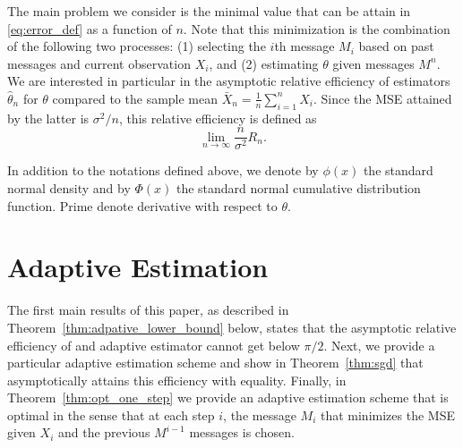 \documentclass[letterpaper, conference]{IEEEtran}      %
\begin{document}
The main problem we consider is the minimal value that can be attain in \eqref{eq:error_def} as a function of $n$. Note that this minimization is the combination of the following two processes: (1) selecting the $i$th message $M_i$ based on past messages and current observation $X_i$, and (2) estimating $\theta$ given messages $M^n$. We are interested in particular in the asymptotic relative efficiency of estimators $\widehat{\theta}_n$ for $\theta$ compared to the sample mean $\bar{X}_n = \frac{1}{n} \sum_{i=1}^n X_i$. Since the MSE attained by the latter is $\sigma^2/n$, this relative efficiency is defined as
\begin{equation}
 \lim_{n \rightarrow \infty} \frac{n}{\sigma^2}  R_n. 
\label{eq:relative_efficiency}
\end{equation}

In addition to the notations defined above, we denote by $\phi(x)$ the standard normal density and by $\Phi(x)$ the standard normal cumulative distribution function. Prime denote derivative with respect to $\theta$.


\section{Adaptive Estimation \label{sec:sequential}}

The first main results of this paper, as described in Theorem~\ref{thm:adpative_lower_bound} below, states that the asymptotic relative efficiency of and adaptive estimator cannot get below $\pi/2$. Next, we provide a particular adaptive estimation scheme and show in Theorem~\ref{thm:sgd} that asymptotically attains this efficiency with equality. Finally, in Theorem~\ref{thm:opt_one_step} we provide an adaptive estimation scheme that is optimal in the sense that at each step $i$, the message $M_i$ that minimizes the MSE given $X_i$ and the previous $M^{i-1}$ messages is chosen. 
\end{document}

